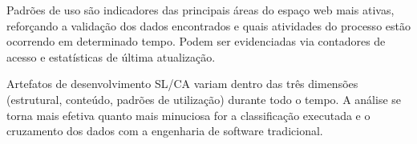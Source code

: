 % 



Padrões de uso são indicadores das principais áreas do espaço web mais ativas, reforçando a validação dos dados encontrados e quais atividades do processo estão ocorrendo em determinado tempo. Podem ser evidenciadas via contadores de acesso e estatísticas de última atualização.



Artefatos de desenvolvimento SL/CA variam dentro das três dimensões (estrutural, conteúdo, padrões de utilização) durante todo o tempo. A análise se torna mais efetiva quanto mais minuciosa for a classificação executada e o cruzamento dos dados com a engenharia de software tradicional.

% 
% 
% 
% 
% 




